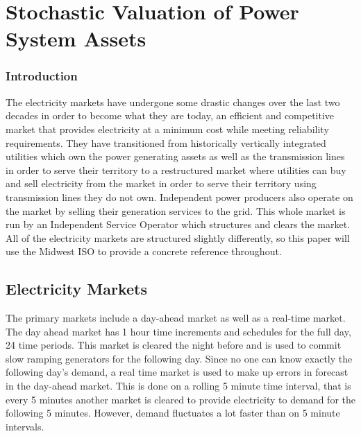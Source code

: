 \section{Stochastic Valuation of Power System Assets}

\subsubsection{Introduction}

The electricity markets have undergone some drastic changes over the last two decades in order to become what they are today, an efficient and competitive market that provides electricity at a minimum cost while meeting reliability requirements.  They have transitioned from historically vertically integrated utilities which own the power generating assets as well as the transmission lines in order to serve their territory to a restructured market where utilities can buy and sell electricity from the market in order to serve their territory using transmission lines they do not own.  Independent power producers also operate on the market by selling their generation services to the grid.  This whole market is run by an Independent Service Operator which structures and clears the market.  All of the electricity markets are structured slightly differently, so this paper will use the Midwest ISO to provide a concrete reference throughout.

\subsection{Electricity Markets}
The primary markets include a day-ahead market as well as a real-time market.  The day ahead market has 1 hour time increments and schedules for the full day, 24 time periods.  This market is cleared the night before and is used to commit slow ramping generators for the following day.  Since no one can know exactly the following day’s demand, a real time market is used to make up errors in forecast in the day-ahead market.  This is done on a rolling 5 minute time interval, that is every 5 minutes another market is cleared to provide electricity to demand for the following 5 minutes.  However, demand fluctuates a lot faster than on 5 minute intervals.

